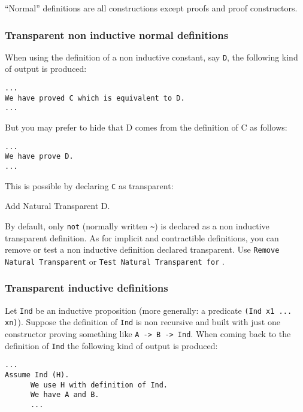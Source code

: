 
``Normal'' definitions are all constructions except proofs and proof constructors.

\subsubsection*{Transparent non inductive normal definitions}

When using the definition of a non inductive constant, say \verb=D=, the
following kind of output is produced:

\begin{verbatim}
...
We have proved C which is equivalent to D.
...
\end{verbatim}

But you may prefer to hide that D comes from the definition of C as
follows:

\begin{verbatim}
...
We have prove D.
...
\end{verbatim}

This is possible by declaring \verb=C= as transparent:

\begin{coq_example*}
Add Natural Transparent D.
\end{coq_example*}

By default, only \verb=not= (normally written \verb=~=) is declared as
a non inductive transparent definition.
As for implicit and contractible definitions, you can remove or test a
non inductive definition declared transparent.
Use \texttt{Remove Natural Transparent} \ident or 
\texttt{Test Natural Transparent for} \ident.

\subsubsection*{Transparent inductive definitions}

Let \verb=Ind= be an inductive proposition (more generally: a
predicate \verb=(Ind x1 ... xn)=). Suppose the definition of
\verb=Ind= is non recursive and built with just
one constructor proving something like \verb=A -> B -> Ind=.
When coming back to the definition of \verb=Ind= the
following kind of output is produced:

\begin{verbatim}
...
Assume Ind (H).
      We use H with definition of Ind.
      We have A and B.
      ...
\end{verbatim}

